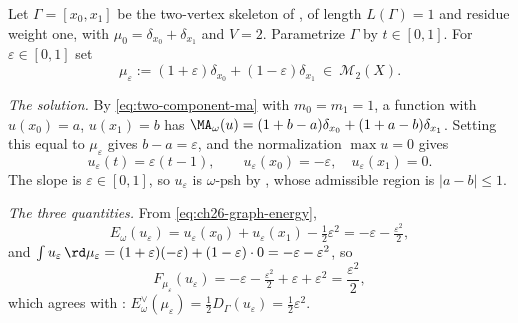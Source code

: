 \begin{example}
\label{ex:ch28-affine-family}
Let \(\Gamma=[x_0,x_1]\) be the two-vertex skeleton of
, of length \(L(\Gamma)=1\) and residue weight
one, with
\(\mu_0=\delta_{x_0}+\delta_{x_1}\) and \(V=2\).  Parametrize \(\Gamma\) by
\(t\in[0,1]\).  For \(\varepsilon\in[0,1]\) set
\[
 \mu_\varepsilon:=(1+\varepsilon)\delta_{x_0}
                 +(1-\varepsilon)\delta_{x_1}
 \ \in\ \mathcal M_2(X).
\]

\emph{The solution.}  By \eqref{eq:two-component-ma} with
\(m_0=m_1=1\), a function with \(u(x_0)=a\), \(u(x_1)=b\) has
\(\MA_\omega(u)=(1+b-a)\delta_{x_0}+(1+a-b)\delta_{x_1}\).  Setting this
equal to \(\mu_\varepsilon\) gives \(b-a=\varepsilon\), and the
normalization \(\max u=0\) gives
\begin{equation}
\label{eq:ch28-affine-solution}
 u_\varepsilon(t)=\varepsilon(t-1),
 \qquad
 u_\varepsilon(x_0)=-\varepsilon,\quad u_\varepsilon(x_1)=0 .
\end{equation}
The slope is \(\varepsilon\in[0,1]\), so \(u_\varepsilon\) is
\(\omega\)-psh by , whose admissible region is
\(|a-b|\leq1\).

\emph{The three quantities.}  From \eqref{eq:ch26-graph-energy},
\[
 E_\omega(u_\varepsilon)
 =u_\varepsilon(x_0)+u_\varepsilon(x_1)-\tfrac12\varepsilon^2
 =-\varepsilon-\tfrac{\varepsilon^2}2 ,
\]
and
\(\int u_\varepsilon\,\rd\mu_\varepsilon
=(1+\varepsilon)(-\varepsilon)+(1-\varepsilon)\cdot0
=-\varepsilon-\varepsilon^2\), so
\[
 F_{\mu_\varepsilon}(u_\varepsilon)
 =-\varepsilon-\tfrac{\varepsilon^2}2+\varepsilon+\varepsilon^2
 =\frac{\varepsilon^2}2 ,
\]
which agrees with :
\(E^\vee_\omega(\mu_\varepsilon)=\tfrac12D_\Gamma(u_\varepsilon)
=\tfrac12\varepsilon^2\).


\end{example}
